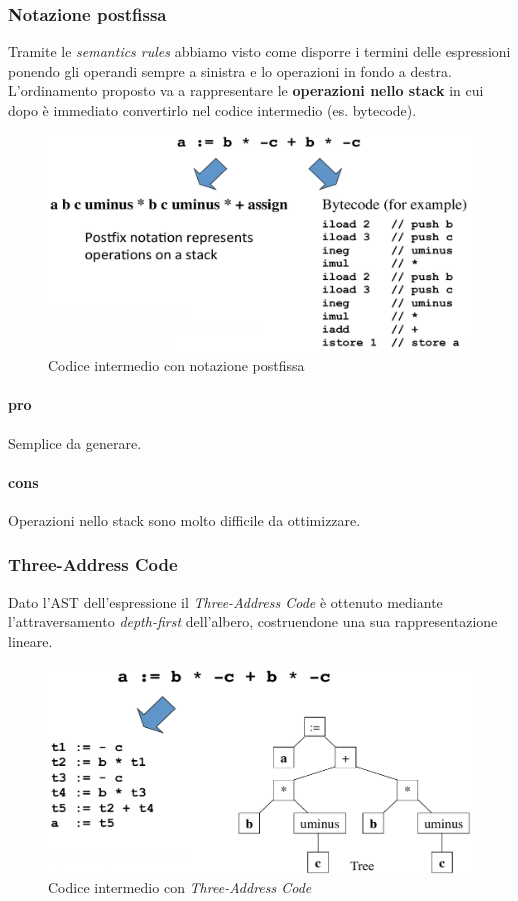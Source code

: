 \subsubsection{Notazione postfissa}
Tramite le \textit{semantics rules} abbiamo visto come disporre i termini delle
espressioni ponendo gli operandi sempre a sinistra e lo operazioni in fondo a
destra. L'ordinamento proposto va a rappresentare le \textbf{operazioni nello
stack} in cui dopo \`e immediato convertirlo nel codice intermedio
(es. bytecode).

\begin{figure}[H]
  \centering
  \includegraphics[scale=0.3]{res/image/postfix_rappresentation}
  \caption{Codice intermedio con notazione postfissa}
  \label{img:postfix_rappresentation}
\end{figure}

\paragraph{pro}
Semplice da generare.
\paragraph{cons}
Operazioni nello stack sono molto difficile da ottimizzare.

\subsubsection{Three-Address Code}
Dato l'AST dell'espressione il \textit{Three-Address Code} \`e ottenuto
mediante l'attraversamento \textit{depth-first} dell'albero, costruendone una
sua rappresentazione lineare.

\begin{figure}[H]
  \centering
  \includegraphics[scale=0.35]{res/image/tac_rappresentation}
  \caption{Codice intermedio con \textit{Three-Address Code}}
  \label{img:tag_rappresentation}
\end{figure}

